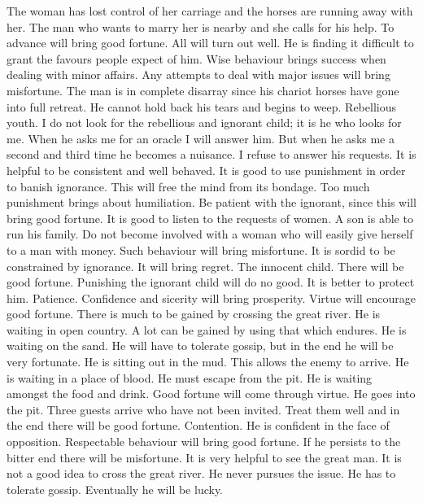 	{The woman has lost control of her carriage and the horses are running away with her. The man who
   		wants to marry her is nearby and she calls for his help. To advance will bring good fortune.
		All will turn out well.}
	{He is finding it difficult to grant the favours people expect of him. Wise behaviour brings success
   		when dealing with minor affairs. Any attempts to deal with major issues will bring misfortune.}
	{The man is in complete disarray since his chariot horses have gone into full retreat. He cannot hold
   		back his tears and begins to weep.}
\or {}
	{Rebellious youth. I do not look for the rebellious and ignorant child; it is he who looks for me. When
   		he asks me for an oracle I will answer him. But when he asks me a second and third time he becomes
		a nuisance. I refuse to answer his requests. It is helpful to be consistent and well behaved.}
	{It is good to use punishment in order to banish ignorance. This will free the mind from its bondage.
		Too much punishment brings about humiliation.}
	{Be patient with the ignorant, since this will bring good fortune. It is good to listen to the
		requests of women.  A son is able to run his family.}
	{Do not become involved with a woman who will easily give herself to a man with money. Such
		behaviour will bring misfortune.}
	{It is sordid to be constrained by ignorance. It will bring regret.}
	{The innocent child. There will be good fortune.}
	{Punishing the ignorant child will do no good. It is better to protect him.}
\or {}
	{Patience. Confidence and sicerity will bring prosperity. Virtue will encourage good fortune. There is
		much to be gained by crossing the great river.}
	{He is waiting in open country. A lot can be gained by using that which endures.}
	{He is waiting on the sand. He will have to tolerate gossip, but in the end he will be very fortunate.}
	{He is sitting out in the mud. This allows the enemy to arrive.}
	{He is waiting in a place of blood. He must escape from the pit.}
	{He is waiting amongst the food and drink. Good fortune will come through virtue.}
	{He goes into the pit. Three guests arrive who have not been invited. Treat them well and in the
   		end there will be good fortune.}
\or {}
	{Contention. He is confident in the face of opposition. Respectable behaviour will bring good fortune.
		If he persists to the bitter end there will be misfortune. It is very helpful to see the great man.
		It is not a good idea to cross the great river.}
	{He never pursues the issue. He has to tolerate gossip. Eventually he will be lucky.}
